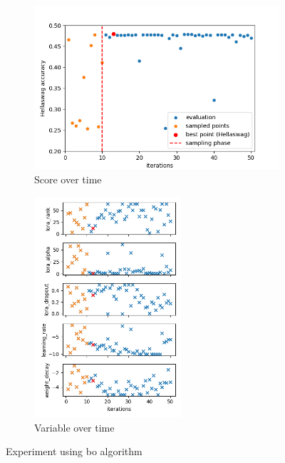 \begin{figure}[h!]
    \centering
    \begin{subfigure}[b]{.50\textwidth}
      \centering
      \includegraphics[width = \textwidth]{figures/bo/score_evolution.png}
      \caption{Score over time}
      \label{fig:bo_score_time}
    \end{subfigure}%
    \begin{subfigure}[b]{.40\textwidth}
      \centering
      \includegraphics[width = 0.6\textwidth]{figures/bo/variables_evolution.png}
      \caption{Variable over time}
      \label{fig:bo_var_time}
    \end{subfigure}
    \caption{Experiment using \acrshort{bo} algorithm}
    \label{fig:bo_res}
\end{figure}

